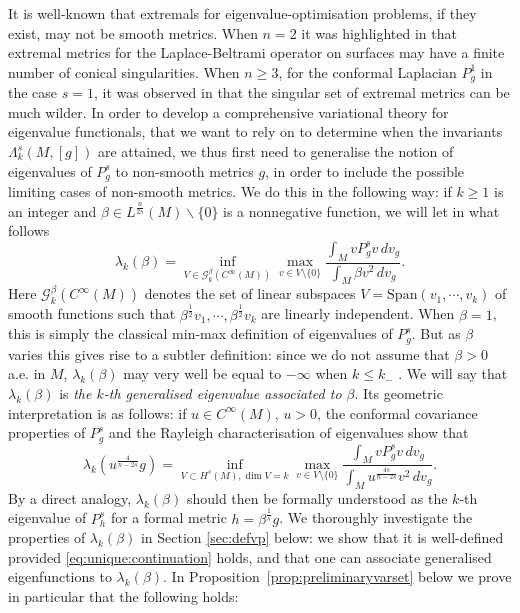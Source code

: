 \documentclass[10pt]{amsart}
\numberwithin{equation}{section}
\def\la{{\lambda}}
\theoremstyle{plain}
\theoremstyle{remark}
\begin{document}
It is well-known that extremals for eigenvalue-optimisation problems, if they exist, may not be smooth metrics. When $n=2$ it was highlighted in \cite{Kokarev,Petrides2} that extremal metrics for the Laplace-Beltrami operator on surfaces may have a finite number of conical singularities. When $n \ge 3$, for the conformal Laplacian $P_g^1$ in the case $s=1$, it was observed in \cite{AmmannHumbert, GurskyPerez} that the singular set of extremal metrics can be much wilder. In order to develop a comprehensive variational theory for eigenvalue functionals, that we want to rely on to determine when the invariants $\Lambda_k^s(M,[g])$ are attained, we thus first need to generalise the notion of eigenvalues of $P_g^s$ to non-smooth metrics $g$, in order to include the possible limiting cases of non-smooth metrics. We do this in the following way: if $k \ge 1$ is an integer and $\beta \in L^{\frac{n}{2s}}(M) \backslash \{0\}$ is a nonnegative function, we will let in what follows 
\begin{equation*} 
 \la_k (\beta)= \inf_{V \in \mathcal{G}^{\beta}_k(C^{\infty}(M))}\max_{v \in V \setminus \{0\}}  \frac{\int_M v P_g^s v \, dv_g}{\int_M \beta v^2 \, dv_g}.
 \end{equation*}
Here $\mathcal{G}^{\beta}_k(C^{\infty}(M))$ denotes the set of linear subspaces $V = \text{Span}(v_1, \cdots, v_k)$ of smooth functions such that $\beta^{\frac12}v_1, \cdots, \beta^{\frac12} v_k$ are linearly independent. When $\beta = 1$, this is simply the classical min-max definition of eigenvalues of $P_g^s$. But as $\beta$ varies this gives rise to a subtler definition: since we do not assume that $\beta >0$ a.e. in $M$, $\lambda_k(\beta)$ may very well be equal to $-\infty$ when $k \le k_-$ . We will say that $\lambda_k(\beta)$ is \emph{the $k$-th generalised eigenvalue associated to $\beta$}. Its geometric interpretation is as follows: if $u \in C^\infty(M)$, $u>0$, the conformal covariance properties of $P_g^s$ and the Rayleigh characterisation of eigenvalues show that
$$  \la_k (u^{\frac{4}{n-2s}}g)= \inf_{V \subset H^s(M), \dim V = k}\max_{v \in V \setminus \{0\}}  \frac{\int_M v P_g^s v \, dv_g}{\int_M u^{\frac{4s}{n-2s}} v^2 \, dv_g}. $$ 
By a direct analogy, $\lambda_k(\beta)$ should then be formally understood as the $k$-th eigenvalue of $P_h^s$ for a formal metric $h = \beta^{\frac{1}{s}} g$. We thoroughly investigate the properties of $\lambda_k(\beta)$ in Section  \ref{sec:defvp} below: we show that it is well-defined provided \eqref{eq:unique:continuation} holds, and that one can associate generalised eigenfunctions to $\lambda_k(\beta)$. In Proposition~\ref{prop:preliminaryvarset} below we prove in particular that the following holds: 
\end{document}
